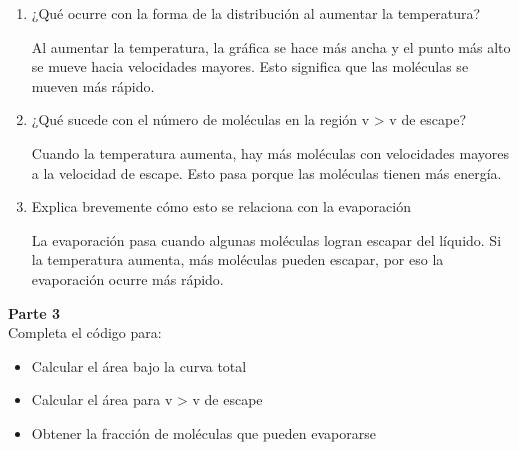 \documentclass[a4paper, 11pt]{article}
\newcommand{\Pspace}{0.5cm}
\newcommand{\Aspace}{0.2cm}
\begin{document}
\newpage
\begin{enumerate}
    \vspace{\Pspace}
    \item ¿Qué ocurre con la forma de la distribución al aumentar la temperatura? \par
        \vspace{\Aspace} \par
        { \color{azul}  
            Al aumentar la temperatura, la gráfica se hace más ancha y el punto más alto se mueve hacia velocidades mayores. 
            Esto significa que las moléculas se mueven más rápido.
        }

    \vspace{\Pspace}
    \item ¿Qué sucede con el número de moléculas en la región v > v de escape? \par
        \vspace{\Aspace} \par
        { \color{azul}  
            Cuando la temperatura aumenta, hay más moléculas con velocidades mayores a la velocidad de escape. 
            Esto pasa porque las moléculas tienen más energía.
        }

    \vspace{\Pspace}
    \item Explica brevemente cómo esto se relaciona con la evaporación \par
        \vspace{\Aspace} \par
        { \color{azul}  
            La evaporación pasa cuando algunas moléculas logran escapar del líquido. 
            Si la temperatura aumenta, más moléculas pueden escapar, por eso la evaporación ocurre más rápido.
        }
\end{enumerate}



\newpage
\Large{ \textbf{ Parte 3 } } \\
Completa el código para:
\begin{itemize}
    \item Calcular el área bajo la curva total
    \item Calcular el área para v > v de escape
    \item Obtener la fracción de moléculas que pueden evaporarse
\end{itemize}
\end{document}
